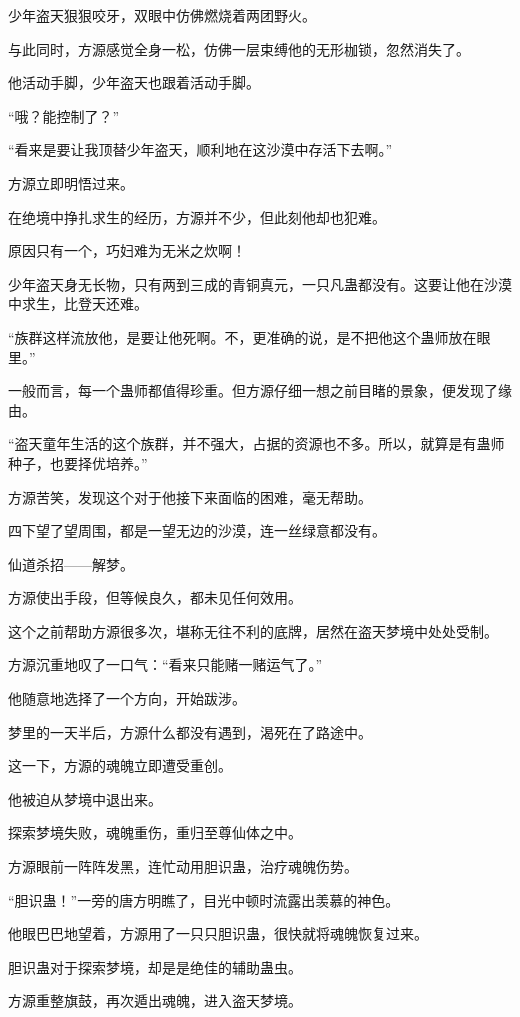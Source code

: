 \begin{this_body}
少年盗天狠狠咬牙，双眼中仿佛燃烧着两团野火。

与此同时，方源感觉全身一松，仿佛一层束缚他的无形枷锁，忽然消失了。

他活动手脚，少年盗天也跟着活动手脚。

“哦？能控制了？”

“看来是要让我顶替少年盗天，顺利地在这沙漠中存活下去啊。”

方源立即明悟过来。

在绝境中挣扎求生的经历，方源并不少，但此刻他却也犯难。

原因只有一个，巧妇难为无米之炊啊！

少年盗天身无长物，只有两到三成的青铜真元，一只凡蛊都没有。这要让他在沙漠中求生，比登天还难。

“族群这样流放他，是要让他死啊。不，更准确的说，是不把他这个蛊师放在眼里。”

一般而言，每一个蛊师都值得珍重。但方源仔细一想之前目睹的景象，便发现了缘由。

“盗天童年生活的这个族群，并不强大，占据的资源也不多。所以，就算是有蛊师种子，也要择优培养。”

方源苦笑，发现这个对于他接下来面临的困难，毫无帮助。

四下望了望周围，都是一望无边的沙漠，连一丝绿意都没有。

仙道杀招——解梦。

方源使出手段，但等候良久，都未见任何效用。

这个之前帮助方源很多次，堪称无往不利的底牌，居然在盗天梦境中处处受制。

方源沉重地叹了一口气：“看来只能赌一赌运气了。”

他随意地选择了一个方向，开始跋涉。

梦里的一天半后，方源什么都没有遇到，渴死在了路途中。

这一下，方源的魂魄立即遭受重创。

他被迫从梦境中退出来。

探索梦境失败，魂魄重伤，重归至尊仙体之中。

方源眼前一阵阵发黑，连忙动用胆识蛊，治疗魂魄伤势。

“胆识蛊！”一旁的唐方明瞧了，目光中顿时流露出羡慕的神色。

他眼巴巴地望着，方源用了一只只胆识蛊，很快就将魂魄恢复过来。

胆识蛊对于探索梦境，却是是绝佳的辅助蛊虫。

方源重整旗鼓，再次遁出魂魄，进入盗天梦境。


\end{this_body}
